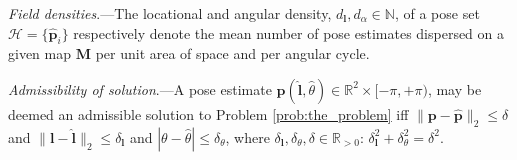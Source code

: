 \begin{definition}
  \label{def:definition_6} \textit{Field densities}.---The locational and
  angular density, $d_{\bm{l}}, d_{\alpha} \in \mathbb{N}$, of a pose set
  $\mathcal{H} = \{\hat{\bm{p}}_i\}$ respectively denote the mean number of
  pose estimates dispersed on a given map $\bm{M}$ per unit area of space and
  per angular cycle.
\end{definition}

\begin{definition}
  \label{def:definition_7} \textit{Admissibility of solution}.---A pose estimate
  $\hat{\bm{p}}(\hat{\bm{l}},\hat{\theta}) \in \mathbb{R}^2 \times [-\pi,+\pi)$,
  may be deemed an admissible solution to Problem \ref{prob:the_problem} iff
  $\|\bm{p}-\hat{\bm{p}}\|_2 \leq \delta$ and
  $\|\bm{l}-\hat{\bm{l}}\|_2 \leq \delta_{\bm{l}}$ and
  $|\theta-\hat{\theta}| \leq \delta_\theta$, where
  $\delta_{\bm{l}}, \delta_\theta, \delta \in \mathbb{R}_{> 0}$:
  $\delta_{\bm{l}}^2 + \delta_{\theta}^2 = \delta^2$.
\end{definition}
